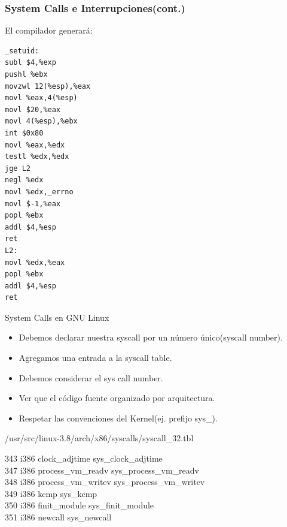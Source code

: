 \begin{frame}[fragile]
\frametitle{System Calls e Interrupciones(cont.)}
El compilador generará:
\begin{lstlisting}
_setuid:
subl $4,%exp
pushl %ebx
movzwl 12(%esp),%eax
movl %eax,4(%esp)
movl $20,%eax
movl 4(%esp),%ebx
int $0x80
movl %eax,%edx
testl %edx,%edx
jge L2
negl %edx
movl %edx,_errno
movl $-1,%eax
popl %ebx
addl $4,%esp
ret
L2:
movl %edx,%eax
popl %ebx
addl $4,%esp
ret

\end{lstlisting}
\end{frame}

\begin{frame}{System Calls en GNU Linux}
   \begin{itemize}  
   \item Debemos declarar nuestra syscall por un número único(syscall number). 
   \item Agregamos una entrada a la syscall table.
   \item Debemos considerar el sys call number.
   \item Ver que el código fuente organizado por arquitectura.
   \item Respetar las convenciones del Kernel(ej. prefijo sys\_).
 \end{itemize}

\begin{block}{/usr/src/linux-3.8/arch/x86/syscalls/syscall\_32.tbl}
  \begin{block}{}
     343     i386    clock\_adjtime            sys\_clock\_adjtime    \\           
     347     i386    process\_vm\_readv        sys\_process\_vm\_readv  \\          
     348     i386    process\_vm\_writev       sys\_process\_vm\_writev \\          
     349     i386    kcmp                      sys\_kcmp \\
     350     i386    finit\_module             sys\_finit\_module \\
     \alert{351     i386    newcall                   sys\_newcall} \\ 
  \end{block}

\end{block}

\end{frame}


